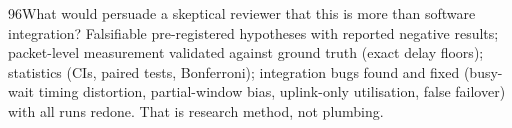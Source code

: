 \begin{qa}{96}{What would persuade a skeptical reviewer that this is more than software integration?}
Falsifiable pre-registered hypotheses with reported negative results; packet-level measurement validated against
ground truth (exact delay floors); statistics (CIs, paired tests, Bonferroni); integration bugs found and fixed
(busy-wait timing distortion, partial-window bias, uplink-only utilisation, false failover) with all runs redone.
That is research method, not plumbing.
\end{qa}
